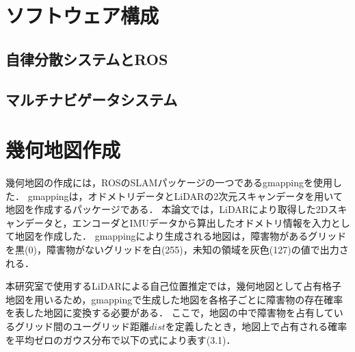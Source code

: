 \section{ソフトウェア構成}
\subsection{自律分散システムとROS}
\subsection{マルチナビゲータシステム}

\section{幾何地図作成}
幾何地図の作成には，ROSのSLAMパッケージの一つであるgmappingを使用した．
gmappingは，オドメトリデータとLiDARの2次元スキャンデータを用いて地図を作成するパッケージである．
本論文では，LiDARにより取得した2Dスキャンデータと，エンコーダとIMUデータから算出したオドメトリ情報を入力として地図を作成した．
gmappingにより生成される地図は，障害物があるグリッドを黒(0)，障害物がないグリッドを白(255)，未知の領域を灰色(127)の値で出力される．

本研究室で使用するLiDARによる自己位置推定では，幾何地図として占有格子地図を用いるため，gmappingで生成した地図を各格子ごとに障害物の存在確率を表した地図に変換する必要がある．
ここで，地図の中で障害物を占有しているグリッド間のユーグリッド距離$\displaystyle dist$を定義したとき，地図上で占有される確率を平均ゼロのガウス分布で以下の式により表す(3.1)．

